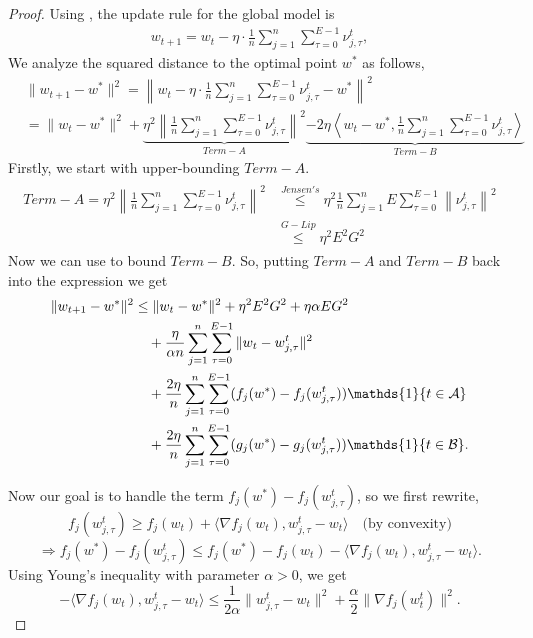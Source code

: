 \documentclass{article} %
\begin{document}
\begin{proof}
    Using , the update rule for the global model is
\begin{align}
w_{t+1} = w_t - \eta \cdot \frac{1}{n} \sum_{j=1}^n \sum_{\tau=0}^{E-1} \nu_{j,\tau}^t,
\end{align}
We analyze the squared distance to the optimal point \( w^* \) as follows,
    \begin{align*}
    &\|w_{t+1} - w^*\|^2 
    = \left\| w_t - \eta \cdot \frac{1}{n} \sum_{j=1}^n \sum_{\tau=0}^{E-1} \nu_{j,\tau}^t - w^* \right\|^2 \\
    &= \|w_t - w^*\|^2 + \underbrace{\eta^2 \left\| \frac{1}{n} \sum_{j=1}^n  \sum_{\tau=0}^{E-1} \nu_{j,\tau}^t \right\|^2}_{Term-A}
     \underbrace{- 2\eta \left\langle w_t - w^*, \frac{1}{n} \sum_{j=1}^n \sum_{\tau=0}^{E-1} \nu_{j,\tau}^t \right\rangle}_{Term-B}
\end{align*}
Firstly, we start with upper-bounding $Term-A$. 
\begin{align*}
    \begin{aligned}
        Term-A = \eta^2 \left\| \frac{1}{n} \sum_{j=1}^n  \sum_{\tau=0}^{E-1} \nu_{j,\tau}^t\right\|^2 &\overset{Jensen's}{\leq} \eta^2 \frac{1}{n} \sum_{j=1}^n E \sum_{\tau=0}^{E-1}\left\|  \nu_{j,\tau}^t\right\|^2 
        \\
        & \overset{G-Lip}{\leq} \eta^2 E^2G^2
    \end{aligned}
\end{align*}
Now we can use  to bound $Term-B$. So, putting $Term-A$ and $Term-B$ back into the expression we get
\begin{align}
    \label{eq:fedsgm_rec_start}
    \| w_{t+1} - w^* \|^2
    &\leq \| w_t - w^* \|^2 
    + \eta^2 E^2 G^2 
    + \eta \alpha E G^2 \notag \\
    &\quad + \frac{\eta}{\alpha n} \sum_{j=1}^n \sum_{\tau=0}^{E-1} \| w_t - w_{j,\tau}^t \|^2 \notag \\
    &\quad + \frac{2\eta}{n} \sum_{j=1}^n \sum_{\tau=0}^{E-1} (f_j(w^*) - f_j(w_{j,\tau}^t))\mathds{1}\{t \in \mathcal{A}\} \notag \\
    &\quad + \frac{2\eta}{n} \sum_{j=1}^n \sum_{\tau=0}^{E-1} (g_j(w^*) - g_j(w_{j,\tau}^t))\mathds{1}\{t \in \mathcal{B}\}.
\end{align}

Now our goal is to handle the term \( f_j(w^*) - f_j(w_{j,\tau}^t) \), so we first rewrite,
\[
f_j(w_{j,\tau}^t) \geq f_j(w_t) + \langle \nabla f_j(w_t), w_{j,\tau}^t - w_t \rangle \quad \text{(by convexity)}
\]
\[
\Rightarrow f_j(w^*) - f_j(w_{j,\tau}^t) 
\leq f_j(w^*) - f_j(w_t) - \langle \nabla f_j(w_t), w_{j,\tau}^t - w_t \rangle.
\]
Using Young's inequality with parameter \(\alpha > 0\), we get
\[
-\langle \nabla f_j(w_t), w_{j,\tau}^t - w_t \rangle 
\leq \frac{1}{2\alpha} \| w_{j,\tau}^t - w_t \|^2 + \frac{\alpha}{2} \| \nabla f_j(w_t^t) \|^2.
\]


\end{proof}
\end{document}

